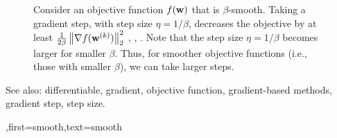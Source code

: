 {{\begin{figure}[H]
\begin{center}
\begin{tikzpicture}[scale=0.8, x=0.7cm,y=0.05cm]
	    	\end{tikzpicture}
	    	\end{center}
	    	\caption{Consider an objective function $f({\bf w})$ that is $\beta$-smooth. 
	    		Taking a gradient step, with step size $\eta = 1/\beta$, decreases the 
	    		objective by at least $\frac{1}{2\beta}\left\Vert  {\nabla f({\bf w}^{(k)})} \right\Vert_{2}^{2}$ \cite{nesterov04}, \cite{CvxBubeck2015}, \cite{CvxAlgBertsekas}. 
	    		Note that the step size $\eta = 1/\beta$ becomes larger for smaller $\beta$. Thus, 
	    		for smoother objective functions (i.e., those with smaller $\beta$), 
				we can take larger steps. \label{fig_gd_smooth_dict}}
	    	\end{figure}
		See also: differentiable, gradient, objective function, gradient-based methods, gradient step, step size.
	    },first={smooth},text={smooth}}

